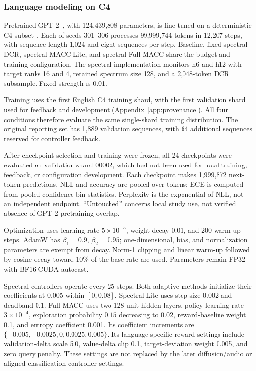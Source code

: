\documentclass[a4paper,fleqn]{cas-dc}
\begin{document}
\subsubsection{Language modeling on C4}
\label{sec:c4_setup}

Pretrained GPT-2~\cite{radford2019gpt2}, with 124,439,808 parameters,
is fine-tuned on a deterministic C4 subset~\cite{raffel2020}.
Each of seeds 301--306 processes 99,999,744 tokens in 12,207
steps, with sequence length 1,024 and eight sequences per step.
Baseline, fixed spectral DCR, spectral MACC-Lite, and spectral
Full MACC share the budget and training configuration.
The spectral implementation monitors h6 and h12 with target
ranks 16 and 4, retained spectrum size 128, and a 2,048-token
DCR subsample. Fixed strength is 0.01.

Training uses the first English C4 training shard, with the first
validation shard used for feedback and development
(Appendix~\ref{app:provenance}). All four conditions therefore
evaluate the same single-shard training distribution.
The original reporting set has 1,889 validation sequences, with
64 additional sequences reserved for controller feedback.

After checkpoint selection and training were frozen, all 24
checkpoints were evaluated on validation shard 00002,
which had not been used for local training, feedback,
or configuration development.
Each checkpoint makes 1,999,872 next-token predictions.
NLL and accuracy are pooled over tokens; ECE is computed from
pooled confidence-bin statistics.
Perplexity is the exponential of NLL, not an independent endpoint.
``Untouched'' concerns local study use, not verified absence of
GPT-2 pretraining overlap.

Optimization uses learning rate $5\times10^{-5}$,
weight decay 0.01, and 200 warm-up steps.
AdamW has $\beta_1=0.9$, $\beta_2=0.95$;
one-dimensional, bias, and normalization parameters are exempt
from decay. Norm-1 clipping and linear warm-up followed by
cosine decay toward 10\% of the base rate are used.
Parameters remain FP32 with BF16 CUDA autocast.

Spectral controllers operate every 25 steps.
Both adaptive methods initialize their coefficients at 0.005
within $[0,0.08]$.
Spectral Lite uses step size 0.002 and deadband 0.1.
Full MACC uses two 128-unit hidden
layers, policy learning rate $3\times10^{-4}$,
exploration probability $0.15$ decreasing to $0.02$,
reward-baseline weight 0.1, and entropy coefficient 0.001.
Its coefficient increments are
$\{-0.005,-0.0025,0,0.0025,0.005\}$.
Its language-specific reward settings include validation-delta
scale 5.0, value-delta clip 0.1, target-deviation weight 0.005,
and zero query penalty.
These settings are not replaced by the later diffusion/audio
or aligned-classification controller settings.
\end{document}
